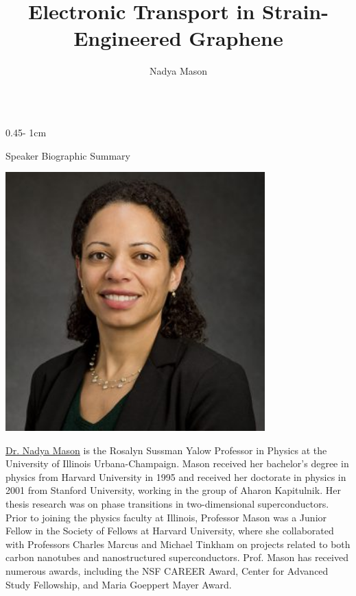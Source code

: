 \documentclass{../psuposter}
\title{Electronic Transport in Strain-Engineered Graphene}
\author{Nadya Mason}
\institute{University of Illinois}
\begin{document}
\begin{frame}
\begin{columns}[t, totalwidth=\textwidth]
\begin{column}{0.45\textwidth - 1cm}


    \begin{block}{Speaker Biographic Summary}
    	\begin{center}
    		\includegraphics[width=0.75\textwidth]{images/portrait}
    	\end{center}
    	\href{https://publish.illinois.edu/masongroup/}{Dr. Nadya Mason} is the Rosalyn Sussman Yalow Professor in Physics at the University of Illinois Urbana-Champaign. Mason received her bachelor's degree in physics from Harvard University in 1995 and received her doctorate in physics in 2001 from Stanford University, working in the group of Aharon Kapitulnik. Her thesis research was on phase transitions in two-dimensional superconductors. Prior to joining the physics faculty at Illinois, Professor Mason was a Junior Fellow in the Society of Fellows at Harvard University, where she collaborated with Professors Charles Marcus and Michael Tinkham on projects related to both carbon nanotubes and nanostructured superconductors. Prof. Mason has received numerous  awards, including the NSF CAREER Award, Center for Advanced Study Fellowship, and Maria Goeppert Mayer Award.
    \end{block}



\end{column}
\end{columns}
\end{frame}
\end{document}
